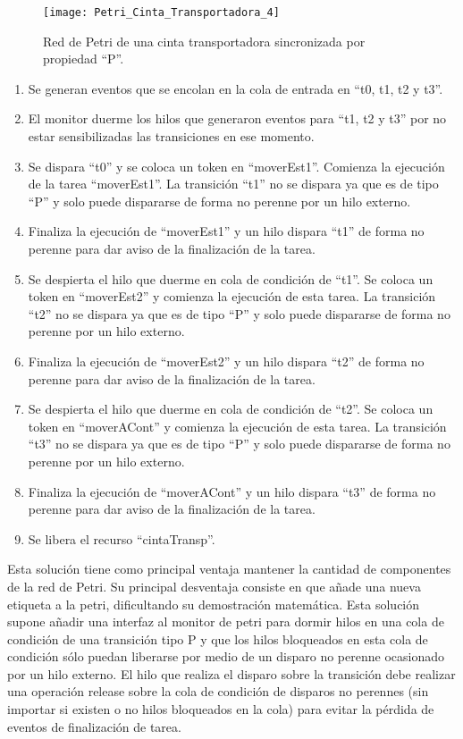 \begin{figure}[H]
    \centering
    \texttt{[image: Petri\_Cinta\_Transportadora\_4]}
    \caption{Red de Petri de una cinta transportadora sincronizada por
    propiedad ``P''.}
    \label{fig:petri_cinta_transportadora_4}
\end{figure}

\begin{enumerate}
    \item Se generan eventos que se encolan en la cola de entrada en “t0, t1,
    t2 y t3”.
	\item El monitor duerme los hilos que generaron eventos para “t1, t2 y t3” por
	no estar sensibilizadas las transiciones en ese momento.
	\item Se dispara ``t0'' y se coloca un token en ``moverEst1''. Comienza la
	ejecución de la tarea ``moverEst1''. La transición ``t1'' no se dispara ya que
	es de tipo ``P'' y solo puede dispararse de forma no perenne por un hilo
	externo.
	\item Finaliza la ejecución de ``moverEst1'' y un hilo dispara ``t1'' de forma
	no perenne para dar aviso de la finalización de la tarea.
	\item Se despierta el hilo que
	duerme en cola de condición de ``t1''. Se coloca un token en ``moverEst2'' y
	comienza la ejecución de esta tarea. La transición ``t2'' no se dispara ya que
	es de tipo ``P'' y solo puede dispararse de forma no perenne por un hilo
	externo.
	\item Finaliza la ejecución de ``moverEst2'' y un hilo dispara ``t2'' de forma
	no perenne para dar aviso de la finalización de la tarea.
	\item  Se despierta el hilo que
	duerme en cola de condición de ``t2''. Se coloca un token en ``moverACont'' y
	comienza la ejecución de esta tarea. La transición ``t3'' no se dispara ya que
	es de tipo ``P'' y solo puede dispararse de forma no perenne por un hilo
	externo.
	\item Finaliza la ejecución de ``moverACont'' y un hilo dispara ``t3'' de forma
	no perenne para dar aviso de la finalización de la tarea.
	\item Se libera el recurso ``cintaTransp''.
\end{enumerate}

Esta solución tiene como principal ventaja mantener la cantidad de componentes
de la red de Petri.
Su principal desventaja consiste en que añade una nueva etiqueta a la
petri, dificultando su demostración matemática. Esta solución supone añadir una
interfaz al monitor de petri para dormir hilos en una cola de condición de una
transición tipo P y que los hilos bloqueados en esta cola de condición sólo
puedan liberarse por medio de un disparo no perenne ocasionado por un hilo
externo.
El hilo que realiza el disparo sobre la transición debe realizar una operación
release sobre la cola de condición de disparos no perennes (sin importar si
existen o no hilos bloqueados en la cola) para evitar la pérdida de eventos de
finalización de tarea.

